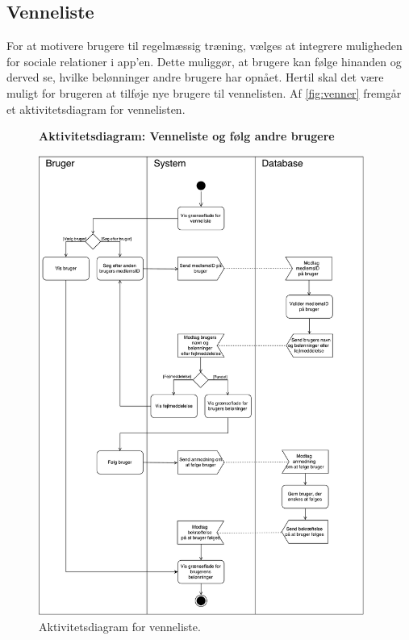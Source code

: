 \subsection*{Venneliste} 
For at motivere brugere til regelmæssig træning, vælges at integrere muligheden for sociale relationer i app'en. Dette muliggør, at brugere kan følge hinanden og derved se, hvilke belønninger andre brugere har opnået. Hertil skal det være muligt for brugeren at tilføje nye brugere til vennelisten. 
Af \autoref{fig:venner} fremgår et aktivitetsdiagram for vennelisten.

\begin{figure} [H]
\centering
\textbf{Aktivitetsdiagram: Venneliste og følg andre brugere}\par\medskip
\includegraphics[width=0.95\textwidth]{figures/aktivitetsdiagram/venner}
\caption{Aktivitetsdiagram for venneliste.}
\label{fig:venner}
\end{figure}

